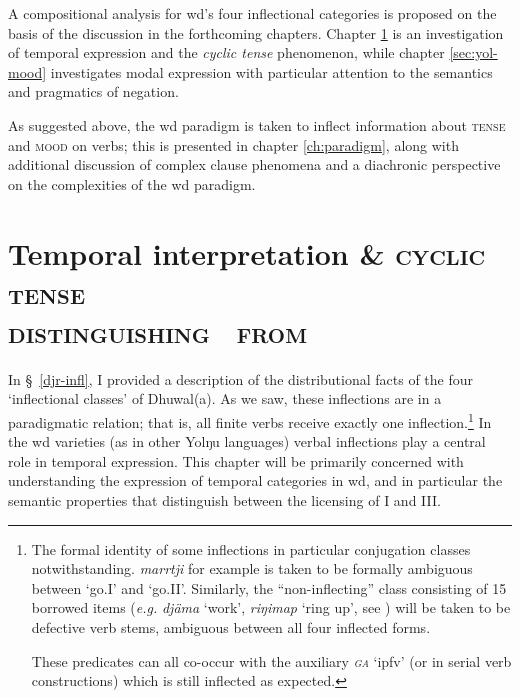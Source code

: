 A compositional analysis for \acrshort{wd}'s four inflectional categories is proposed on the basis of the discussion in the forthcoming chapters. Chapter \ref{sec:djr-temp} is an investigation of temporal expression and the \textit{cyclic tense} phenomenon, while chapter \ref{sec:yol-mood} investigates modal expression with particular attention to the semantics and pragmatics of negation.

 As suggested above, the \acrshort{wd} paradigm is taken to inflect information about \textsc{tense} and \textsc{mood} on verbs; this is presented in chapter \ref{ch:paradigm}, along with additional discussion of complex clause phenomena and a diachronic perspective on the complexities of the \gls{wd} paradigm.
 


\chapter{Temporal interpretation \& \textsc{cyclic tense\\{\large distinguishing \I~from \III}}}\label{sec:djr-temp}

\noindent In §~\ref{djr-infl}, I provided a description of the distributional facts of the four `inflectional classes' of Dhuwal(a). As we saw, these inflections are in a paradigmatic relation; that is, all finite verbs receive exactly one inflection.\footnote{The formal identity of some inflections in particular conjugation classes notwithstanding. \textit{marrtji} for example is taken to be formally ambiguous between `go.\gls{I}' and `go.\gls{II}'. Similarly, the ``non-inflecting'' class consisting of 15 borrowed items (\textit{e.g.} \textit{djäma} `work', \textit{riŋimap} `ring up', see \citealp[308]{Wilkinson1991}) will be taken to be defective verb stems, ambiguous between all four inflected forms.
	
	 These predicates can all co-occur with the auxiliary \textit{\textsc{ga}} `\gls{ipfv}' (or in serial verb constructions) which is still inflected as expected.}
  In the \acrlong{wd} varieties (as in other Yolŋu languages) verbal inflections play a central role in temporal expression. This chapter will be primarily concerned with understanding the expression of temporal categories in \acrshort{wd}, and in particular the semantic properties that distinguish between the licensing of \gls{I} and \gls{III}.

